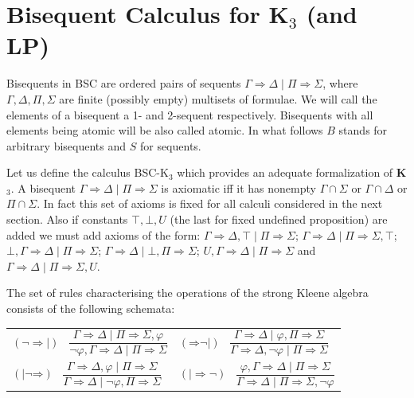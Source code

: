 \documentclass[11pt,a4paper,titlepage]{article}
\theoremstyle{definition}
\newcommand{\3}{\vspace{.3in}}
\newcommand{\2}{\vspace{.2in}}
\newcommand{\1}{\vspace{.1in}}
\newcommand{\5}{\vspace{.05in}}
\begin{document}
\section{Bisequent Calculus for K$_3$ (and LP)}\label{StrongKleene}


Bisequents in BSC are ordered pairs of sequents $\Gamma\Rightarrow\Delta \mid \Pi\Rightarrow\Sigma$, where $\Gamma, \Delta, \Pi, \Sigma$ are
finite (possibly empty) multisets of formulae. We will call the elements of a bisequent a 1- and 2-sequent respectively. Bisequents with all elements being atomic will be also called atomic. In what follows $ B $ stands for
arbitrary bisequents and $ S $ for sequents.

Let us define the calculus BSC-K$_3$ which provides an adequate formalization of {\bf K$_3$}. 
A bisequent $\Gamma\Rightarrow\Delta \mid \Pi\Rightarrow\Sigma$ is axiomatic iff it has nonempty $\Gamma\cap\Sigma$ or $\Gamma\cap\Delta$ or $\Pi\cap\Sigma$. 
In fact this set of axioms is fixed for all calculi considered in the next section. Also if constants $\top, \bot, U$ (the last for fixed undefined proposition) are added we must add axioms of the form: $\Gamma\Rightarrow\Delta, \top \mid \Pi\Rightarrow\Sigma$; $\Gamma\Rightarrow\Delta \mid \Pi\Rightarrow\Sigma, \top$; $\bot, \Gamma\Rightarrow\Delta \mid \Pi\Rightarrow\Sigma$; $\Gamma\Rightarrow\Delta \mid \bot, \Pi\Rightarrow\Sigma$; $U, \Gamma\Rightarrow\Delta \mid \Pi\Rightarrow\Sigma$ and $\Gamma\Rightarrow\Delta \mid \Pi\Rightarrow\Sigma, U$.

The set of rules characterising the operations of the strong Kleene algebra consists of the following schemata:

\1

\noindent\begin{tabular}{ll}

	$(\mathord{\neg}\mathord{\Rightarrow\mid})$ \ $\dfrac{\Gamma
		\Rightarrow \Delta \mid \Pi\Rightarrow\Sigma, \varphi}{\neg\varphi, \Gamma \Rightarrow \Delta \mid \Pi\Rightarrow\Sigma}$ &
	$(\mathord{\Rightarrow}\mathord{\neg\mid})$ \ $\dfrac{\Gamma
		\Rightarrow \Delta \mid \varphi, \Pi\Rightarrow\Sigma}{\Gamma
		\Rightarrow \Delta, \neg\varphi \mid \Pi\Rightarrow\Sigma}$\\[16pt]
	
	$(\mathord{\mid\neg}\mathord{\Rightarrow})$ \ $\dfrac{\Gamma
		\Rightarrow \Delta, \varphi \mid \Pi\Rightarrow\Sigma}{\Gamma \Rightarrow \Delta \mid \neg\varphi, \Pi\Rightarrow\Sigma}$ &
	$(\mathord{\mid\Rightarrow}\mathord{\neg})$ \ $\dfrac{\varphi, \Gamma
		\Rightarrow \Delta \mid \Pi\Rightarrow\Sigma}{\Gamma
		\Rightarrow \Delta \mid \Pi\Rightarrow\Sigma, \neg\varphi}$\\[16pt]
\end{tabular}
	
\end{document}
